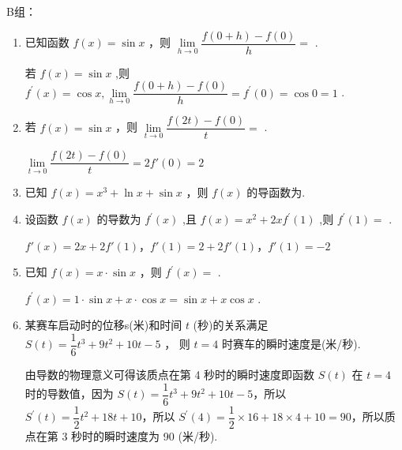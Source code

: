 B组：
\begin{enumerate}
    \item 已知函数 $f\left( x\right)  = \sin x$ ，则 $\mathop{\lim }\limits_{{h \rightarrow  0}}\dfrac{f\left( {0 + h}\right)  - f\left( 0\right) }{h} =$ .
    \begin{jieda}
        若 $f\left( x\right)  = \sin x$ ,则 ${f}^{\prime }\left( x\right)  = \cos x,\mathop{\lim }\limits_{{h \rightarrow  0}}\dfrac{f\left( {0 + h}\right)  - f\left( 0\right) }{h} = {f}^{\prime }\left( 0\right)  = \cos 0 = 1$ .
    \end{jieda}
    
    \item 若 $f\left( x\right)  = \sin x$ ，则 $\mathop{\lim }\limits_{{t \rightarrow  0}}\dfrac{f\left( {2t}\right)  - f\left( 0\right) }{t} =$ .
    \begin{jieda}
        $\mathop{\lim }\limits_{{t \rightarrow  0}}\dfrac{f\left( {2t}\right)  - f\left( 0\right) }{t} = 2f'(0) = 2$
    \end{jieda}
    
    \item 已知 $f\left( x\right)  = {x}^{3} + \ln x + \sin x$ ，则 $f\left( x\right)$ 的导函数为.
    
    \item 设函数 $f\left( x\right)$ 的导数为 ${f}^{\prime }\left( x\right)$ ,且 $f\left( x\right)  = {x}^{2} + {2x}{f}^{\prime }\left( 1\right)$ ,则 ${f}^{\prime }\left( 1\right)  =$ .
    \begin{jieda}
        $f'(x) = 2x+2f'(1)$，$f'(1) = 2+2f'(1)$，$f'(1) = -2$
    \end{jieda}
    
    \item 已知 $f\left( x\right)  = x \cdot  \sin x$ ，则 ${f}^{\prime }\left( x\right)  =$ .
    \begin{jieda}
        ${f}^{\prime }\left( x\right)  = 1 \cdot  \sin x + x \cdot  \cos x = \sin x + x\cos x$ .
    \end{jieda}
    
    \item 某赛车启动时的位移s(米)和时间 $t$ (秒)的关系满足 $S\left( t\right)  = \dfrac{1}{6}{t}^{3} + 9{t}^{2} + {10t} - 5$ ， 则 $t = 4$ 时赛车的瞬时速度是(米/秒).
    \begin{jieda}
        由导数的物理意义可得该质点在第 4 秒时的瞬时速度即函数 $S\left( t\right)$ 在 $t = 4$ 时的导数值，因为 $S\left( t\right)  = \dfrac{1}{6}{t}^{3} + 9{t}^{2} + {10t} - 5$，所以 ${S}^{\prime }\left( t\right)  = \dfrac{1}{2}{t}^{2} + {18t} + {10}$，所以 ${S}^{\prime }\left( 4\right)  = \dfrac{1}{2} \times  {16} + {18} \times  4 + {10} = {90}$，所以质点在第 3 秒时的瞬时速度为 90 (米/秒).
    \end{jieda}


\end{enumerate}
